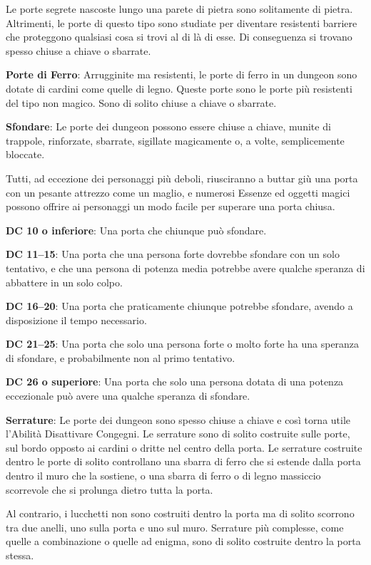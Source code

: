 \documentclass[a4paper,11pt,twoside,openany]{book}
\begin{document}
Le porte segrete nascoste lungo una parete di pietra sono solitamente di pietra. Altrimenti, le porte di questo tipo sono studiate per diventare resistenti barriere che proteggono qualsiasi cosa si trovi al di là di esse. Di conseguenza si trovano spesso chiuse a chiave o sbarrate.

\textbf{Porte di Ferro}: Arrugginite ma resistenti, le porte di ferro in un dungeon sono dotate di cardini come quelle di legno. Queste porte sono le porte più resistenti del tipo non magico. Sono di solito chiuse a chiave o sbarrate.

\textbf{Sfondare}: Le porte dei dungeon possono essere chiuse a chiave, munite di trappole, rinforzate, sbarrate, sigillate magicamente o, a volte, semplicemente bloccate.

Tutti, ad eccezione dei personaggi più deboli, riusciranno a buttar giù una porta con un pesante attrezzo come un maglio, e numerosi Essenze ed oggetti magici possono offrire ai personaggi un modo facile per superare una porta chiusa.

\textbf{DC 10 o inferiore}: Una porta che chiunque può sfondare.

\textbf{DC 11--15}: Una porta che una persona forte dovrebbe sfondare con un solo tentativo, e che una persona di potenza media potrebbe avere qualche speranza di abbattere in un solo colpo.

\textbf{DC 16--20}: Una porta che praticamente chiunque potrebbe sfondare, avendo a disposizione il tempo necessario.

\textbf{DC 21--25}: Una porta che solo una persona forte o molto forte ha una speranza di sfondare, e probabilmente non al primo tentativo.

\textbf{DC 26 o superiore}: Una porta che solo una persona dotata di una potenza eccezionale può avere una qualche speranza di sfondare.

\textbf{Serrature}: Le porte dei dungeon sono spesso chiuse a chiave e così torna utile l'Abilità Disattivare Congegni. Le serrature sono di solito costruite sulle porte, sul bordo opposto ai cardini o dritte nel centro della porta. Le serrature costruite dentro le porte di solito controllano una sbarra di ferro che si estende dalla porta dentro il muro che la sostiene, o una sbarra di ferro o di legno massiccio scorrevole che si prolunga dietro tutta la porta.

Al contrario, i lucchetti non sono costruiti dentro la porta ma di solito scorrono tra due anelli, uno sulla porta e uno sul muro. Serrature più complesse, come quelle a combinazione o quelle ad enigma, sono di solito costruite dentro la porta stessa.
\end{document}
